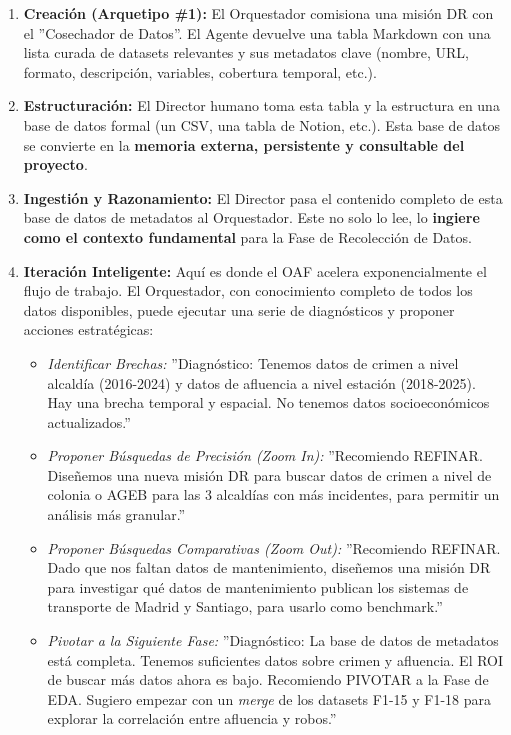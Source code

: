 \documentclass[11pt, a4paper]{article}
\begin{document}
\begin{enumerate}
    \item \textbf{Creación (Arquetipo \#1):} El Orquestador comisiona una misión DR con el ''Cosechador de Datos''. El Agente devuelve una tabla Markdown con una lista curada de datasets relevantes y sus metadatos clave (nombre, URL, formato, descripción, variables, cobertura temporal, etc.).

    \item \textbf{Estructuración:} El Director humano toma esta tabla y la estructura en una base de datos formal (un CSV, una tabla de Notion, etc.). Esta base de datos se convierte en la \textbf{memoria externa, persistente y consultable del proyecto}.

    \item \textbf{Ingestión y Razonamiento:} El Director pasa el contenido completo de esta base de datos de metadatos al Orquestador. Este no solo lo lee, lo \textbf{ingiere como el contexto fundamental} para la Fase de Recolección de Datos.

    \item \textbf{Iteración Inteligente:} Aquí es donde el OAF acelera exponencialmente el flujo de trabajo. El Orquestador, con conocimiento completo de todos los datos disponibles, puede ejecutar una serie de diagnósticos y proponer acciones estratégicas:
    \begin{itemize}
        \item \textit{Identificar Brechas:} ''Diagnóstico: Tenemos datos de crimen a nivel alcaldía (2016-2024) y datos de afluencia a nivel estación (2018-2025). Hay una brecha temporal y espacial. No tenemos datos socioeconómicos actualizados.''
        \item \textit{Proponer Búsquedas de Precisión (Zoom In):} ''Recomiendo REFINAR. Diseñemos una nueva misión DR para buscar datos de crimen a nivel de colonia o AGEB para las 3 alcaldías con más incidentes, para permitir un análisis más granular.''
        \item \textit{Proponer Búsquedas Comparativas (Zoom Out):} ''Recomiendo REFINAR. Dado que nos faltan datos de mantenimiento, diseñemos una misión DR para investigar qué datos de mantenimiento publican los sistemas de transporte de Madrid y Santiago, para usarlo como benchmark.''
        \item \textit{Pivotar a la Siguiente Fase:} ''Diagnóstico: La base de datos de metadatos está completa. Tenemos suficientes datos sobre crimen y afluencia. El ROI de buscar más datos ahora es bajo. Recomiendo PIVOTAR a la Fase de EDA. Sugiero empezar con un \textit{merge} de los datasets F1-15 y F1-18 para explorar la correlación entre afluencia y robos.''
    \end{itemize}
\end{enumerate}
\end{document}
